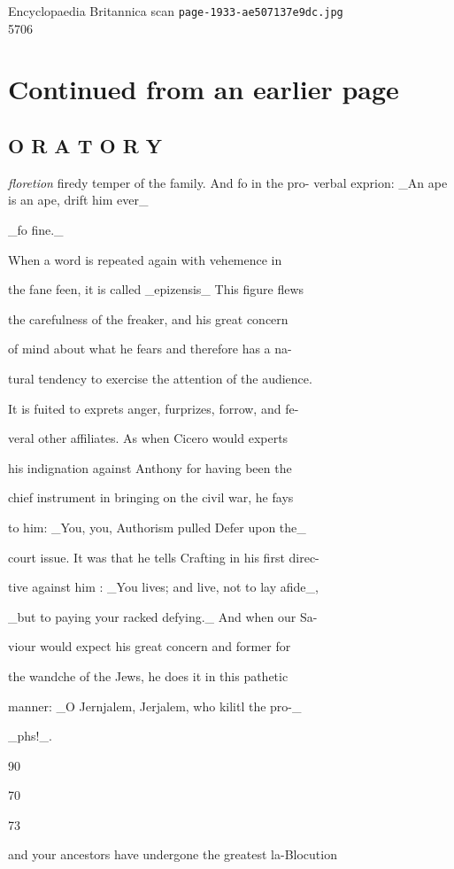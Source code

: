 \documentclass{article}
\begin{document}
\begin{center}
{\Large Encyclopaedia Britannica scan \texttt{page-1933-ae507137e9dc.jpg}}\\[0.5em]
5706
\end{center}
\section*{Continued from an earlier page}
\subsection*{O R A T O R Y}
\textit{floretion}
firedy temper of the family. And fo in the pro- verbal exprion: \_An ape is an ape, drift him ever\_

\_fo fine.\_

When a word is repeated again with vehemence in

the fane feen, it is called \_epizensis\_ This figure flews

the carefulness of the freaker, and his great concern

of mind about what he fears and therefore has a na-

tural tendency to exercise the attention of the audience.

It is fuited to exprets anger, furprizes, forrow, and fe-

veral other affiliates. As when Cicero would experts

his indignation against Anthony for having been the

chief instrument in bringing on the civil war, he fays

to him: \_You, you, Authorism pulled Defer upon the\_

court issue. It was that he tells Crafting in his first direc-

tive against him : \_You lives; and live, not to lay afide\_,

\_but to paying your racked defying.\_ And when our Sa-

viour would expect his great concern and former for

the wandche of the Jews, he does it in this pathetic

manner: \_O Jernjalem, Jerjalem, who kilitl the pro-\_

\_phs!\_.

90

70

73

and your ancestors have undergone the greatest la-Blocution
\end{document}
